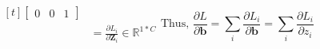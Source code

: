 \documentclass{article}
\begin{document}
\begin{subequations}
\begin{equation}
\begin{aligned}[t]
\begin{bmatrix}
                                                                       0 & 0 & 1
                                                                   \end{bmatrix}\\
                                                           &= \frac{\partial L_{i}}{\partial \boldsymbol{Z}_{i}} \in \mathds{R}^{1*C}
        \end{aligned}
    \end{equation}
    \begin{equation}
        \text{Thus, } \frac{\partial L}{\partial \boldsymbol{b}} = \sum\limits_{i}\frac{\partial L_{i}}{\partial \boldsymbol{b}}
                                                                 = \sum\limits_{i}\frac{\partial L_{i}}{\partial z_{i}}
    \end{equation}
\end{subequations}
\end{document}
